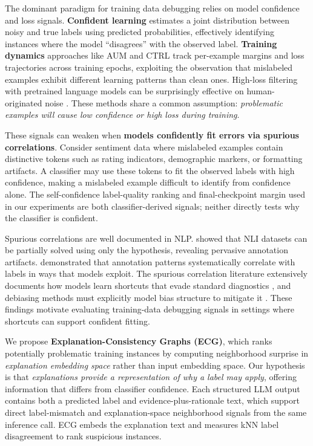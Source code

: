 \documentclass[letterpaper]{article}
\begin{document}
The dominant paradigm for training data debugging relies on model confidence and loss signals.
\textbf{Confident learning} \citep{northcutt2021confident} estimates a joint distribution between noisy and true labels using predicted probabilities, effectively identifying instances where the model ``disagrees'' with the observed label.
\textbf{Training dynamics} approaches like AUM \citep{pleiss2020identifying} and CTRL \citep{yue2022ctrl} track per-example margins and loss trajectories across training epochs, exploiting the observation that mislabeled examples exhibit different learning patterns than clean ones.
High-loss filtering with pretrained language models can be surprisingly effective on human-originated noise \citep{chong2022detecting}.
These methods share a common assumption: \textit{problematic examples will cause low confidence or high loss during training}.

These signals can weaken when \textbf{models confidently fit errors via spurious correlations}.
Consider sentiment data where mislabeled examples contain distinctive tokens such as rating indicators, demographic markers, or formatting artifacts.
A classifier may use these tokens to fit the observed labels with high confidence, making a mislabeled example difficult to identify from confidence alone.
The self-confidence label-quality ranking and final-checkpoint margin used in our experiments are both classifier-derived signals; neither directly tests why the classifier is confident.

Spurious correlations are well documented in NLP.
\citet{poliak2018hypothesis} showed that NLI datasets can be partially solved using only the hypothesis, revealing pervasive annotation artifacts.
\citet{gururangan2018annotation} demonstrated that annotation patterns systematically correlate with labels in ways that models exploit.
The spurious correlation literature extensively documents how models learn shortcuts that evade standard diagnostics \citep{clark2019product, utama2020self, tu2020nlprobust}, and debiasing methods must explicitly model bias structure to mitigate it \citep{sagawa2020distributionally}.
These findings motivate evaluating training-data debugging signals in settings where shortcuts can support confident fitting.

We propose \textbf{Explanation-Consistency Graphs (ECG)}, which ranks potentially problematic training instances by computing neighborhood surprise in \textit{explanation embedding space} rather than input embedding space.
Our hypothesis is that \textit{explanations provide a representation of why a label may apply}, offering information that differs from classifier confidence.
Each structured LLM output contains both a predicted label and evidence-plus-rationale text, which support direct label-mismatch and explanation-space neighborhood signals from the same inference call.
ECG embeds the explanation text and measures kNN label disagreement to rank suspicious instances.
\end{document}
